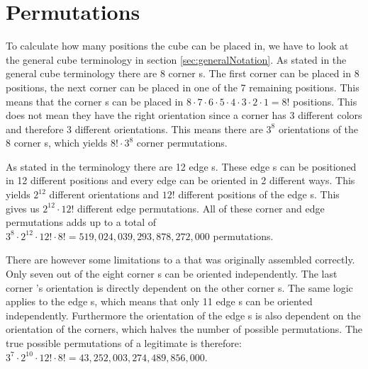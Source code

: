 \section{Permutations}
\label{sec:permutations}
To calculate how many positions the cube can be placed in, we have to look at the general cube terminology in section \ref{sec:generalNotation}.
As stated in the general cube terminology there are 8 corner \cpiece{}s. The first corner \cpiece{} can be placed in 8 positions, the next corner \cpiece{} can be placed in one of the 7 remaining positions. %
This means that the corner \cpiece{}s can be placed in $8\cdot7\cdot6\cdot5\cdot4\cdot3\cdot2\cdot1=8!$ positions. 
This does not mean they have the right orientation since a corner \cpiece{} has 3 different colors and therefore 3 different orientations. This means there are $3^8$ orientations of the 8 corner \cpiece{}s, which yields $8!\cdot3^8$ corner permutations. 

As stated in the terminology there are 12 edge \cpiece{}s. These edge \cpiece{}s can be positioned in 12 different positions and every edge \cpiece{} can be oriented in 2 different ways. This yields $2^{12}$ different orientations and $12!$ different positions of the edge \cpiece{}s. This gives us $2^{12}\cdot12!$ different edge permutations. All of these corner and edge permutations adds up to a total of  $3^8\cdot2^{12}\cdot12!\cdot8!=519,024,039,293,878,272,000$ permutations.

There are however some limitations to a \rubik{} that was originally assembled correctly. 
Only seven out of the eight corner \cpiece{}s can be oriented independently. 
The last corner \cpiece{}'s orientation is directly dependent on the other corner \cpiece{}s. 
The same logic applies to the edge \cpiece{}s, which means that only 11 edge \cpiece{}s can be oriented independently.
Furthermore the orientation of the edge \cpiece{}s is also dependent on the orientation of the corners, which halves the number of possible permutations.
The true possible permutations of a legitimate \rubik{} is therefore:
$3^7\cdot2^{10}\cdot12!\cdot8!=43,252,003,274,489,856,000$.